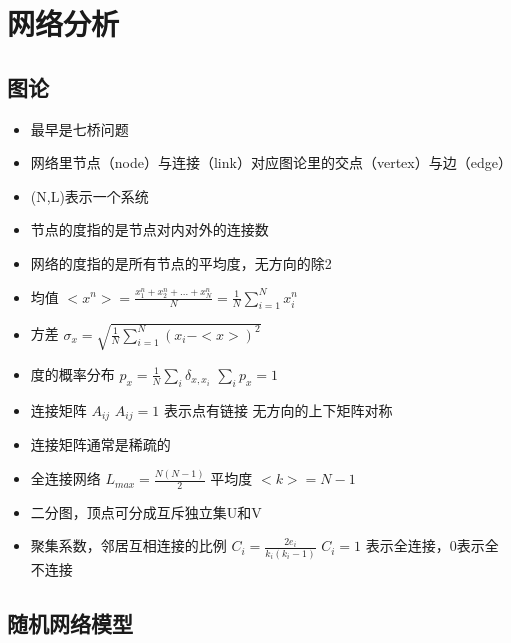 \documentclass[]{book}
\providecommand{\tightlist}{%
  \setlength{\itemsep}{0pt}\setlength{\parskip}{0pt}}
\begin{document}
\hypertarget{neta}{%
\chapter{网络分析}\label{neta}}

\hypertarget{ux56feux8bba}{%
\section{图论}\label{ux56feux8bba}}

\begin{itemize}
\tightlist
\item
  最早是七桥问题
\item
  网络里节点（node）与连接（link）对应图论里的交点（vertex）与边（edge）
\item
  (N,L)表示一个系统
\item
  节点的度指的是节点对内对外的连接数
\item
  网络的度指的是所有节点的平均度，无方向的除2
\item
  均值 \(<x^n> = \frac{x_1^n+x_2^n+...+x_N^n}{N} = \frac{1}{N}\sum_{i=1}^N x_i^n\)
\item
  方差 \(\sigma_x = \sqrt{\frac{1}{N}\sum_{i=1}^N (x_i-<x>)^2}\)
\item
  度的概率分布 \(p_x = \frac{1}{N}\sum_i \delta_{x,x_i}\) \(\sum_ip_x = 1\)
\item
  连接矩阵 \(A_{ij}\) \(A_{ij} = 1\) 表示点有链接 无方向的上下矩阵对称
\item
  连接矩阵通常是稀疏的
\item
  全连接网络 \(L_{max} = \frac{N(N-1)}{2}\) 平均度 \(<k> = N-1\)
\item
  二分图，顶点可分成互斥独立集U和V
\item
  聚集系数，邻居互相连接的比例 \(C_i = \frac{2e_i}{k_i(k_i-1)}\) \(C_i =1\) 表示全连接，0表示全不连接
\end{itemize}

\hypertarget{ux968fux673aux7f51ux7edcux6a21ux578b}{%
\section{随机网络模型}\label{ux968fux673aux7f51ux7edcux6a21ux578b}}
\end{document}
